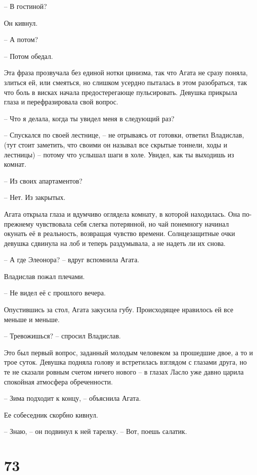 \documentclass[
  a5paperpaper,
  DIV=11,
  numbers=noendperiod]{scrreprt}
\begin{document}
-- В гостиной?

Он кивнул.

-- А потом?

-- Потом обедал.

Эта фраза прозвучала без единой нотки цинизма, так что Агата не сразу
поняла, злиться ей, или смеяться, но слишком усердно пыталась в этом
разобраться, так что боль в висках начала предостерегающе пульсировать.
Девушка прикрыла глаза и перефразировала свой вопрос.

-- Что я делала, когда ты увидел меня в следующий раз?

-- Спускался по своей лестнице, -- не отрываясь от готовки, ответил
Владислав, (тут стоит заметить, что своими он называл все скрытые
тоннели, ходы и лестницы) -- потому что услышал шаги в холе. Увидел, как
ты выходишь из комнат.

-- Из своих апартаментов?

-- Нет. Из закрытых.

Агата открыла глаза и вдумчиво оглядела комнату, в которой находилась.
Она по-прежнему чувствовала себя слегка потерянной, но чай понемногу
начинал окунать её в реальность, возвращая чувство времени.
Солнцезащитные очки девушка сдвинула на лоб и теперь раздумывала, а не
надеть ли их снова.

-- А где Элеонора? -- вдруг вспомнила Агата.

Владислав пожал плечами.

-- Не видел её с прошлого вечера.

Опустившись за стол, Агата закусила губу. Происходящее нравилось ей все
меньше и меньше.

-- Тревожишься? -- спросил Владислав.

Это был первый вопрос, заданный молодым человеком за прошедшие двое, а
то и трое суток. Девушка подняла голову и встретилась взглядом с глазами
друга, но те не сказали ровным счетом ничего нового -- в глазах Ласло
уже давно царила спокойная атмосфера обреченности.

-- Зима подходит к концу, -- объяснила Агата.

Ее собеседник скорбно кивнул.

-- Знаю, -- он подвинул к ней тарелку. -- Вот, поешь салатик.

\section*{73}\label{73}
\end{document}
